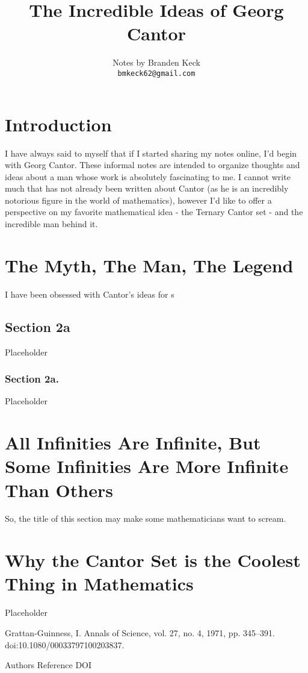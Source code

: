 \documentclass{article}
\title{
The Incredible Ideas of Georg Cantor
}
\author{
  Notes by Branden Keck\\
  \texttt{bmkeck62@gmail.com} \\
}
\date{}
\begin{document}
\maketitle

\section{Introduction}
I have always said to myself that if I started sharing my notes online, I'd begin with Georg Cantor.  These informal notes are intended to organize thoughts and ideas about a man whose work is absolutely fascinating to me.  I cannot write much that has not already been written about Cantor (as he is an incredibly notorious figure in the world of mathematics), however I'd like to offer a perspective on my favorite mathematical idea - the Ternary Cantor set - and the incredible man behind it.

\section{The Myth, The Man, The Legend}
I have been obsessed with Cantor's ideas for s

\subsection{Section 2a}
Placeholder

\subsubsection{Section 2a.}
Placeholder

\section{All Infinities Are Infinite, But Some Infinities Are More Infinite Than Others}
So, the title of this section may make some mathematicians want to scream.

\section{Why the Cantor Set is the Coolest Thing in Mathematics}
Placeholder

\begin{thebibliography}{1}

Grattan-Guinness, I.
\newblock Annals of Science, vol. 27, no. 4, 1971, pp. 345–391.
\newblock doi:10.1080/00033797100203837.

Authors
\newblock Reference
\newblock DOI

\end{thebibliography}
\end{document}
